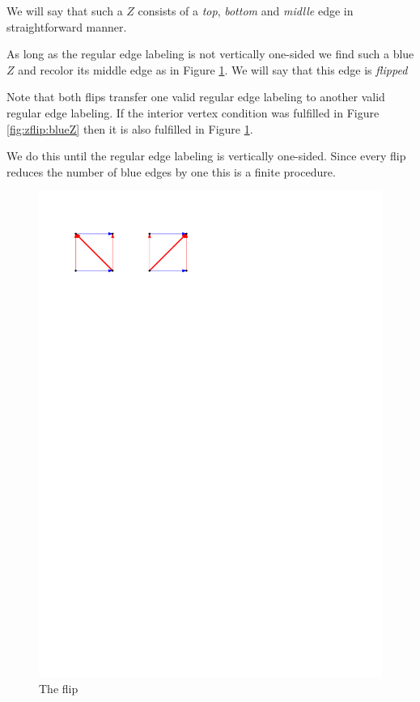   We will say that such a $Z$ consists of a \emph{top}, \emph{bottom} and \emph{midlle} edge in straightforward manner. 


  As long as the regular edge labeling is not vertically one-sided we find such a blue $Z$ and recolor its middle edge as in Figure \ref{fig:zflip:flip}. We will say that this edge is \emph{flipped}

  Note that both flips transfer one valid regular edge labeling to another valid regular edge labeling. If the interior vertex condition was fulfilled in Figure \ref{fig:zflip:blueZ} then it is also fulfilled in Figure \ref{fig:zflip:flip}.

   We do this until the regular edge labeling is vertically one-sided. Since every flip reduces the number of blue edges by one this is a finite procedure.

  \begin{figure}[h]
    \centering
    \includegraphics[scale=1]{unifiedAlgo/img/zflip/flip.pdf}
    \caption{The flip}
    \label{fig:zflip:flip}
  \end{figure}

